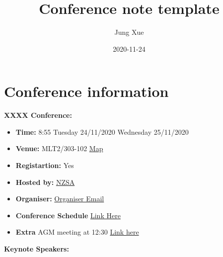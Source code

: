 \documentclass[
]{book}
\title{Conference note template}
\author{Jung Xue}
\date{2020-11-24}
\providecommand{\tightlist}{%
  \setlength{\itemsep}{0pt}\setlength{\parskip}{0pt}}
\begin{document}
\maketitle

{
\setcounter{tocdepth}{1}
\tableofcontents
}
\hypertarget{conference-information}{%
\chapter*{Conference information}\label{conference-information}}

\textbf{XXXX Conference:}

\begin{itemize}
\tightlist
\item
  \textbf{Time:} 8:55 Tuesday 24/11/2020 Wednesday 25/11/2020
\item
  \textbf{Venue:} MLT2/303-102 \href{https://cdn.auckland.ac.nz/assets/auckland/students/academic-information/exams-and-final-results/maps/city-campus.pdf}{Map}
\item
  \textbf{Registartion:} Yes
\item
  \textbf{Hosted by:} \href{https://www.stats.org.nz/nzsa-unconference-november-2020/}{NZSA}
\item
  \textbf{Organiser:} \href{}{Organiser Email}
\item
  \textbf{Conference Schedule} \href{https://nzsa2020.nz/sched.php}{Link Here}
\item
  \textbf{Extra} AGM meeting at 12:30 \href{https://nzsa2020.nz/NZSA-AGM-2020-Agenda.pdf}{Link here}
\end{itemize}

\textbf{Keynote Speakers:}
\end{document}
